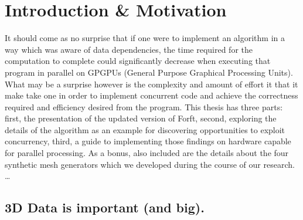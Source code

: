 \chapter{Introduction \& Motivation}
\label{ch1}
It should come as no surprise that if one were to implement an algorithm in a way which was aware of data dependencies, the time required for the computation to complete could significantly decrease when executing that program in parallel on GPGPUs (General Purpose Graphical Processing Units).  What may be a surprise however is the complexity and amount of effort it that it make take one in order to implement concurrent code and achieve the correctness required and efficiency desired from the program. This thesis has three parts: first, the presentation of the updated version of Forf{t}, second, exploring the details of the algorithm as an example for discovering opportunities to exploit concurrency, third, a guide to implementing those findings on hardware capable for parallel processing. As a bonus, also included are the details about the four synthetic mesh generators which we developed during the course of our research.
\ldots
{}






%
%
%
\section{3D Data is important (and big).}

